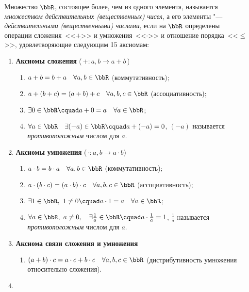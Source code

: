 \begin{defn}
Множество $\bbR$, состоящее более, чем из одного элемента, называется \textit{множеством действительных (вещественных) чисел}, а его элементы "--- \textit{действительными (вещественными) числами}, если на $\bbR$ определены операции сложения~<<$+$>> и умножения~<<$\cdot$>> и отношение порядка~<<$\le$>>, удовлетворяющие следующим 15 аксиомам:
\end{defn}

\begin{enumerate}[label=\Roman*.]
\item
\textbf{Аксиомы сложения} (\,$+\colon a,b \to a+b$\,)
\begin{enumerate}[label=\arabic*.]
\item 
$a + b = b + a\quad\forall a,b \in \bbR$ (коммутативность);
\item
$a + (b + c) = (a + b) + c\quad \forall a,b,c \in \bbR$ (ассоциативность);
\item
$\exists 0 \in \bbR\cquad a + 0 = a\quad \forall a \in \bbR$;
\item 
$\forall a \in \bbR \quad \exists (-a) \in \bbR\cquad a + (-a) = 0$, $(-a)$ называется \textit{противоположным} числом для $a$.
\end{enumerate}
\item
\textbf{Аксиомы умножения} (\,$\cdot\colon a,b \to a\cdot b$)
\begin{enumerate}[resume, label=\arabic*.]
\item
$a\cdot b = b \cdot a \quad \forall a,b\in \bbR$ (коммутативность);
\item
$a \cdot (b \cdot c) = (a \cdot b) \cdot c\quad \forall a,b,c \in \bbR$ (ассоциативность);
\item 
$\exists 1 \in \bbR,\ 1\ne 0\cquad a\cdot1 = a\quad \forall a\in \bbR$;
\item 
$\forall a\in \bbR,\ a\ne 0,\quad \exists \frac{1}{a} \in \bbR\cquad a\cdot \frac{1}{a} = 1$, $\frac{1}{a}$ называется \textit{противоположным} числом для $a$.
\end{enumerate}
\item
\textbf{Аксиома связи сложения и умножения}
\begin{enumerate}[resume, label=\arabic*.]
\item
$(a+b) \cdot c = a\cdot c +  b\cdot c\quad \forall a,b,c \in \bbR$ (дистрибутивность умножения относительно сложения).
\end{enumerate}
\item

\end{enumerate}
